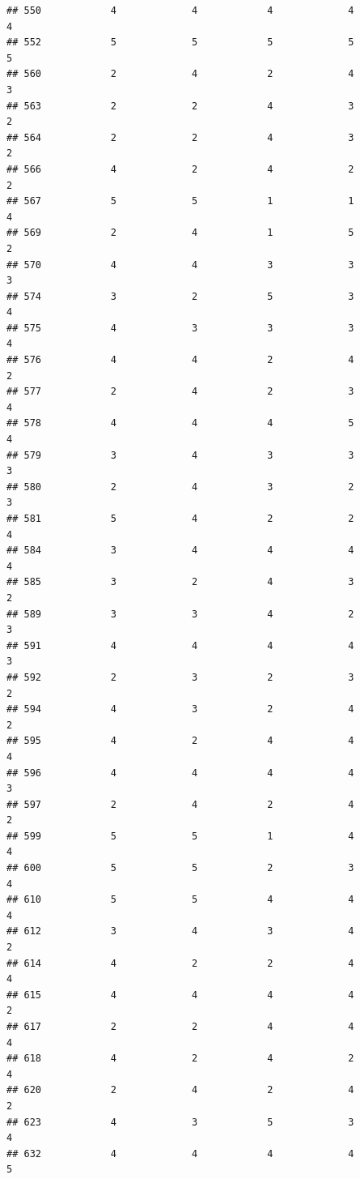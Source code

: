 \documentclass[
]{article}
\begin{document}
\begin{verbatim}
## 550            4             4            4             4          4
## 552            5             5            5             5          5
## 560            2             4            2             4          3
## 563            2             2            4             3          2
## 564            2             2            4             3          2
## 566            4             2            4             2          2
## 567            5             5            1             1          4
## 569            2             4            1             5          2
## 570            4             4            3             3          3
## 574            3             2            5             3          4
## 575            4             3            3             3          4
## 576            4             4            2             4          2
## 577            2             4            2             3          4
## 578            4             4            4             5          4
## 579            3             4            3             3          3
## 580            2             4            3             2          3
## 581            5             4            2             2          4
## 584            3             4            4             4          4
## 585            3             2            4             3          2
## 589            3             3            4             2          3
## 591            4             4            4             4          3
## 592            2             3            2             3          2
## 594            4             3            2             4          2
## 595            4             2            4             4          4
## 596            4             4            4             4          3
## 597            2             4            2             4          2
## 599            5             5            1             4          4
## 600            5             5            2             3          4
## 610            5             5            4             4          4
## 612            3             4            3             4          2
## 614            4             2            2             4          4
## 615            4             4            4             4          2
## 617            2             2            4             4          4
## 618            4             2            4             2          4
## 620            2             4            2             4          2
## 623            4             3            5             3          4
## 632            4             4            4             4          5

\end{verbatim}
\end{document}
